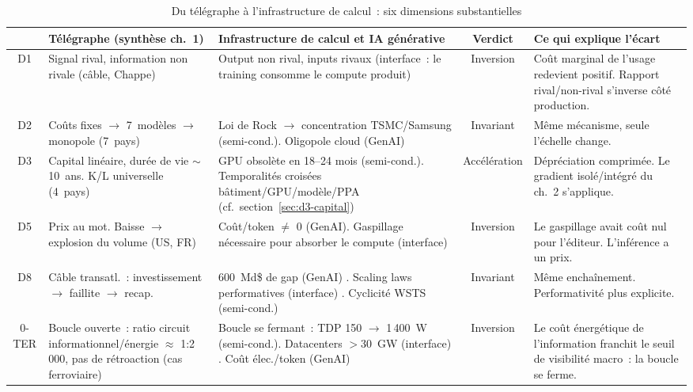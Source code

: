 \begin{table}[p]
\caption{Du télégraphe à l'infrastructure de calcul~: six dimensions substantielles}\label{tab:dim-telegraph-genai}
\centering\footnotesize
\renewcommand{\arraystretch}{1.15}
\begin{tabularx}{\textwidth}{@{}cp{2.8cm}p{3.3cm}cp{4.2cm}@{}}
\toprule
 & \textbf{Télégraphe (synthèse ch.~1)} & \textbf{Infrastructure de calcul et IA générative} & \textbf{Verdict} & \textbf{Ce qui explique l'écart} \\
\midrule
D1 & Signal rival, information non rivale (câble, Chappe) & Output non rival, inputs rivaux (interface~: le training consomme le compute produit) \parencite{cottier_rapid_2025} & Inversion & Coût marginal de l'usage redevient positif. Rapport rival/non-rival s'inverse côté production. \\[3pt]
D2 & Coûts fixes $\rightarrow$ 7~modèles $\rightarrow$ monopole (7~pays) & Loi de Rock $\rightarrow$ concentration TSMC/Samsung (semi-cond.). Oligopole cloud (GenAI) \parencite{gruber_semiconductor_1996} & Invariant & Même mécanisme, seule l'échelle change. \\[3pt]
D3 & Capital linéaire, durée de vie $\sim$10~ans. K/L universelle (4~pays) & GPU obsolète en 18--24 mois (semi-cond.). Temporalités croisées bâtiment/GPU/modèle/PPA (cf.~section~\ref{sec:d3-capital}) & Accélération & Dépréciation comprimée. Le gradient isolé/intégré du ch.~2 s'applique. \\[3pt]
D5 & Prix au mot. Baisse $\rightarrow$ explosion du volume (US, FR) & Coût/token $\neq$ 0 (GenAI). Gaspillage nécessaire pour absorber le compute (interface) \parencite{cottier_rapid_2025} & Inversion & Le gaspillage avait coût nul pour l'éditeur. L'inférence a un prix. \\[3pt]
D8 & Câble transatl.~: investissement $\rightarrow$ faillite $\rightarrow$ recap. & 600~Md\$ de gap (GenAI) \parencite{cahn_question_2024}. Scaling laws performatives (interface) \parencite{kaplan_scaling_2020}. Cyclicité WSTS (semi-cond.) & Invariant & Même enchaînement. Performativité plus explicite. \\[3pt]
\midrule
0-TER & Boucle ouverte~: ratio circuit informationnel/énergie $\approx$ 1:2\,000, pas de rétroaction (cas ferroviaire) & Boucle se fermant~: TDP 150 $\rightarrow$ 1\,400~W (semi-cond.). Datacenters $>$30~GW (interface) \parencite{epoch_electricity_2025}. Coût élec./token (GenAI) & Inversion & Le coût énergétique de l'information franchit le seuil de visibilité macro~: la boucle se ferme. \\
\bottomrule
\end{tabularx}
\renewcommand{\arraystretch}{1.0}
\end{table}

